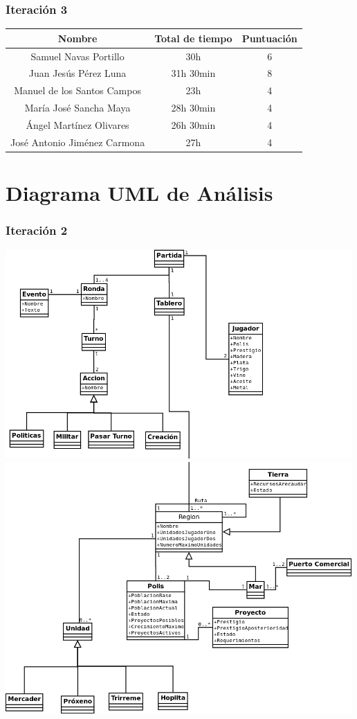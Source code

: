 \documentclass[11 pt]{book}
\begin{document}
		\subsection*{Iteración 3}			
			\begin{tabular}{|c|c|c|}
				\hline
				Nombre & Total de tiempo & Puntuación\\
				\hline
				Samuel Navas Portillo & 30h & 6\\
				Juan Jesús Pérez Luna & 31h 30min & 8\\
				Manuel de los Santos Campos & 23h & 4\\
				María José Sancha Maya & 28h 30min & 4\\
				Ángel Martínez Olivares & 26h 30min & 4\\
				José Antonio Jiménez Carmona & 27h & 4\\
				\hline
			\end{tabular}
\chapter{Diagrama UML de Análisis}
	\subsection*{Iteración 2}
		\begin{center}
			\includegraphics[width=500px]{analysis-uml/iteration2/part1.png}
			\includegraphics[width=500px]{analysis-uml/iteration2/part2.png}
		\end{center}
\end{document}
